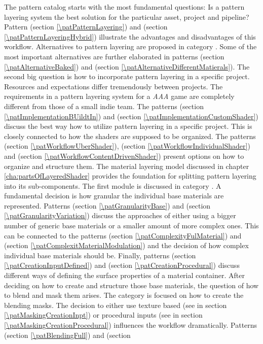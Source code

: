 The pattern catalog starts with the most fundamental questions:
Is a pattern layering system the best solution for the particular asset, project and pipeline? Pattern \emph{\patPatternLayering} (section \ref{\patPatternLayering}) and \emph{\patPatternLayeringHybrid} (section \ref{\patPatternLayeringHybrid}) illustrate the advantages and disadvantages of this workflow. Alternatives to pattern layering are proposed in category \emph{\patCatAlternatives}. Some of the most important alternatives are further elaborated in patterns \emph{\patAlternativeBaked} (section \ref{\patAlternativeBaked}) and \emph{\patAlternativeDifferentMatierals} (section \ref{\patAlternativeDifferentMatierals}). The second big question is how to incorporate pattern layering in a specific project. Resources and expectations differ tremendously between projects. The requirements in a pattern layering system for a \emph{AAA} game are completely different from those of a small indie team.  The patterns \emph{\patImplementationBUildtIn} (section \ref{\patImplementationBUildtIn}) and \emph{\patImplementationCustomShader} (section \ref{\patImplementationCustomShader}) discuss the best way how to utilize pattern layering in a specific project. This is closely connected to how the shaders are supposed to be organized. The patterns \emph{\patWorkflowUberShader} (section \ref{\patWorkflowUberShader}), \emph{\patWorkflowIndividualShader} (section \ref{\patWorkflowIndividualShader}) and \emph{\patWorkflowContentDrivenShader} (section \ref{\patWorkflowContentDrivenShader}) present options on how to organize and structure them. The material layering model discussed in chapter \ref{cha:partsOfLayeredShader} provides the foundation for splitting pattern layering into its sub-components. The first module is discussed in category \emph{\patCatMaterialContainer}. A fundamental decision is how granular the individual base materials are represented. Patterns \emph{\patGranularityBase} (section \ref{\patGranularityBase}) and \emph{\patGranularityVariation} (section \ref{\patGranularityVariation}) discuss the approaches of either using a bigger number of generic base materials or a smaller amount of more complex ones. This can be connected to the patterns \emph{\patComplexityFulMaterial} (section \ref{\patComplexityFulMaterial}) and \emph{\patComplexitMaterialModulation} (section \ref{\patComplexitMaterialModulation}) and the decision of how complex individual base materials should be. Finally, patterns \emph{\patCreationInputDefined} (section \ref{\patCreationInputDefined}) and \emph{\patCreationProcedural} (section \ref{\patCreationProcedural}) discuss different ways of defining the surface properties of a material container. After deciding on how to create and structure those base materials, the question  of how to blend and mask them arises. The category \emph{\patCatMaskingContainer} is focused on how to create the blending masks. The decision to either use texture based (see \emph{\patMaskingCreationInpt} in section \ref{\patMaskingCreationInpt}) or procedural inputs (see \emph{\patMaskingCreationProcedural} in section \ref{\patMaskingCreationProcedural}) influences the workflow dramatically. Patterns \emph{\patBlendingFull} (section \ref{\patBlendingFull}) and \emph{\patBlendingPartially} (section 